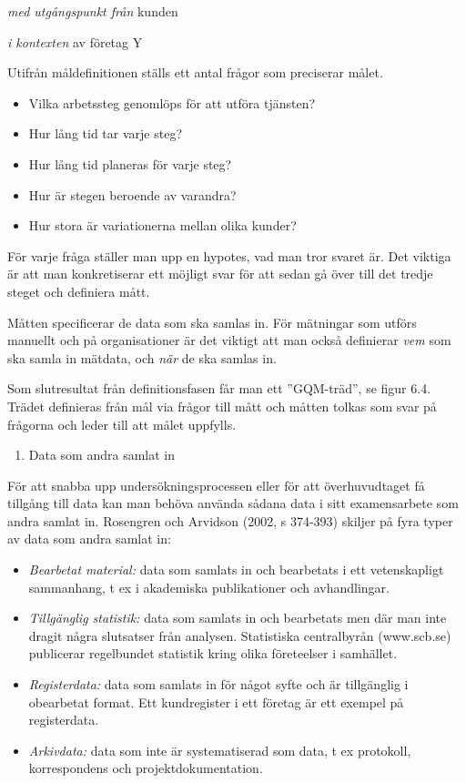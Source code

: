 \emph{med utgångspunkt från} kunden

\emph{i kontexten} av företag Y

Utifrån måldefinitionen ställs ett antal frågor som preciserar målet.

\begin{itemize}
\item
  Vilka arbetssteg genomlöps för att utföra tjänsten?
\item
  Hur lång tid tar varje steg?
\item
  Hur lång tid planeras för varje steg?
\item
  Hur är stegen beroende av varandra?
\item
  Hur stora är variationerna mellan olika kunder?
\end{itemize}

För varje fråga ställer man upp en hypotes, vad man tror svaret är. Det
viktiga är att man konkretiserar ett möjligt svar för att sedan gå över
till det tredje steget och definiera mått.

Måtten specificerar de data som ska samlas in. För mätningar som utförs
manuellt och på organisationer är det viktigt att man också definierar
\emph{vem} som ska samla in mätdata, och \emph{när} de ska samlas in.

Som slutresultat från definitionsfasen får man ett ''GQM-träd'', se
figur 6.4. Trädet definieras från mål via frågor till mått och måtten
tolkas som svar på frågorna och leder till att målet uppfylls.

\begin{enumerate}
\def\labelenumi{\arabic{enumi}.}
\item
  Data som andra samlat in
\end{enumerate}

För att snabba upp undersökningsprocessen eller för att överhuvudtaget
få tillgång till data kan man behöva använda sådana data i sitt
examensarbete som andra samlat in. Rosengren och Arvidson (2002, s
374-393) skiljer på fyra typer av data som andra samlat in:

\begin{itemize}
\item
  \emph{Bearbetat material:} data som samlats in och bearbetats i ett
  vetenskapligt sammanhang, t ex i akademiska publikationer och
  avhandlingar.
\item
  \emph{Tillgänglig statistik:} data som samlats in och bearbetats men
  där man inte dragit några slutsatser från analysen. Statistiska
  centralbyrån (www.scb.se) publicerar regelbundet statistik kring olika
  företeelser i samhället.
\item
  \emph{Registerdata:} data som samlats in för något syfte och är
  tillgänglig i obearbetat format. Ett kundregister i ett företag är ett
  exempel på registerdata.
\item
  \emph{Arkivdata:} data som inte är systematiserad som data, t ex
  protokoll, korrespondens och projektdokumentation.
\end{itemize}

